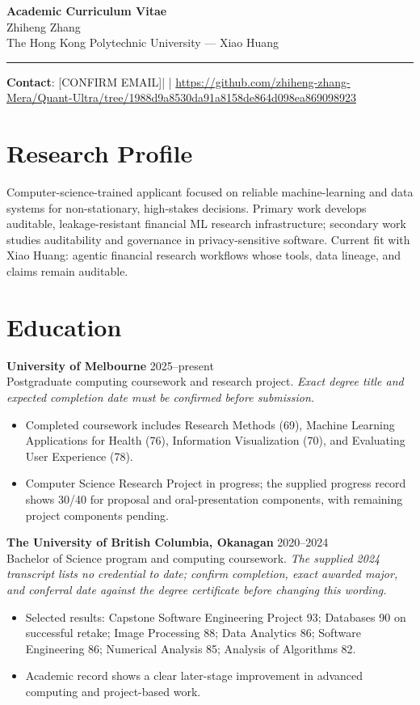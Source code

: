 \documentclass[11pt]{article}
\newcommand{\ApplicantName}{Zhiheng Zhang}
\newcommand{\ApplicantEmail}{[CONFIRM EMAIL]}
\newcommand{\ApplicantPhone}{[CONFIRM PHONE]}
\newcommand{\ApplicantGitHub}{\url{https://github.com/zhiheng-zhang-Mera/Quant-Ultra/tree/1988d9a8530da91a8158de864d098ea869098923}}
\begin{document}
\begin{center}
{\LARGE\bfseries Academic Curriculum Vitae}\\[0.25em]
{\large \ApplicantName}\\
The Hong Kong Polytechnic University --- Xiao Huang
\end{center}
\vspace{0.35em}\hrule\vspace{0.65em}

\textbf{Contact}: \ApplicantEmail\quad | \quad \ApplicantPhone\quad | \quad \ApplicantGitHub

\section*{Research Profile}
Computer-science-trained applicant focused on reliable machine-learning and data systems for non-stationary, high-stakes decisions. Primary work develops auditable, leakage-resistant financial ML research infrastructure; secondary work studies auditability and governance in privacy-sensitive software. Current fit with Xiao Huang: agentic financial research workflows whose tools, data lineage, and claims remain auditable.

\section*{Education}
\textbf{University of Melbourne} \hfill 2025--present\\
Postgraduate computing coursework and research project. \textit{Exact degree title and expected completion date must be confirmed before submission.}
\begin{itemize}
\item Completed coursework includes Research Methods (69), Machine Learning Applications for Health (76), Information Visualization (70), and Evaluating User Experience (78).
\item Computer Science Research Project in progress; the supplied progress record shows 30/40 for proposal and oral-presentation components, with remaining project components pending.
\end{itemize}

\textbf{The University of British Columbia, Okanagan} \hfill 2020--2024\\
Bachelor of Science program and computing coursework. \textit{The supplied 2024 transcript lists no credential to date; confirm completion, exact awarded major, and conferral date against the degree certificate before changing this wording.}
\begin{itemize}
\item Selected results: Capstone Software Engineering Project 93; Databases 90 on successful retake; Image Processing 88; Data Analytics 86; Software Engineering 86; Numerical Analysis 85; Analysis of Algorithms 82.
\item Academic record shows a clear later-stage improvement in advanced computing and project-based work.
\end{itemize}
\end{document}
